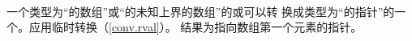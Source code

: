 \paragraph{} %
一个类型为“的数组”或“的未知上界的数组”的\lvalue{}或\rvalue{}可以转
换成类型为“的指针”的一个\prvalue{}。应用临时\mat{}转换（\ref{conv.rval}）。
结果为指向数组第一个元素的指针。

